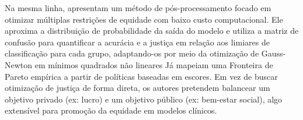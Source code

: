 Na mesma linha, \citet{jang2022group} apresentam um método de pós-processamento focado em otimizar múltiplas restrições de equidade com baixo custo computacional. Ele aproxima a distribuição de probabilidade da saída do modelo e utiliza a matriz de confusão para quantificar a acurácia e a justiça em relação aos limiares de classificação para cada grupo, adaptando-os por meio da otimização de Gauss-Newton em mínimos quadrados não lineares
Já \citet{rolf2020balancing} mapeiam uma Fronteira de Pareto empírica a partir de políticas baseadas em escores. Em vez de buscar otimização de justiça de forma direta, os autores pretendem balancear um objetivo privado (ex: lucro) e um objetivo público (ex: bem-estar social), algo extensível para promoção da equidade em modelos clínicos.

